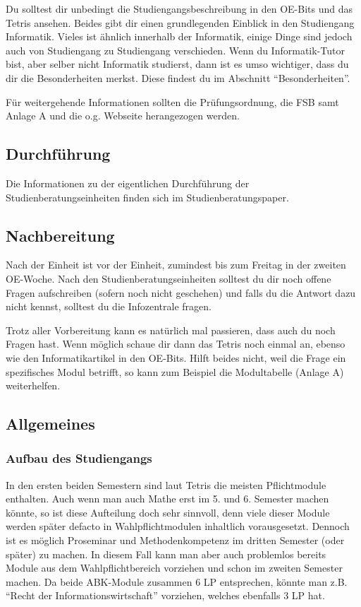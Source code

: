 \documentclass[a4paper,11pt]{scrartcl} %
\begin{document}
Du solltest dir unbedingt die Studiengangsbeschreibung in den OE-Bits und das Tetris ansehen. Beides gibt dir einen grundlegenden Einblick in den Studiengang Informatik. Vieles ist ähnlich innerhalb der Informatik, einige Dinge sind jedoch auch von Studiengang zu Studiengang verschieden. Wenn du Informatik-Tutor bist, aber selber nicht Informatik studierst, dann ist es umso wichtiger, dass du dir die Besonderheiten merkst. Diese findest du im Abschnitt "`Besonderheiten"'.

Für weitergehende Informationen sollten die Prüfungsordnung, die FSB samt Anlage A und die o.g. Webseite herangezogen werden.

	\subsection{Durchführung}
	
Die Informationen zu der eigentlichen Durchführung der Studienberatungseinheiten finden sich im Studienberatungspaper. 

	\subsection{Nachbereitung}

Nach der Einheit ist vor der Einheit, zumindest bis zum Freitag in der zweiten OE-Woche. Nach den Studienberatungseinheiten solltest du dir noch offene Fragen aufschreiben (sofern noch nicht geschehen) und falls du die Antwort dazu nicht kennst, solltest du die Infozentrale fragen.

Trotz aller Vorbereitung kann es natürlich mal passieren, dass auch du noch Fragen hast. Wenn möglich schaue dir dann das Tetris noch einmal an, ebenso wie den Informatikartikel in den OE-Bits. Hilft beides nicht, weil die Frage ein spezifisches Modul betrifft, so kann zum Beispiel die Modultabelle (Anlage A) weiterhelfen.

	\subsection{Allgemeines}
	
		\subsubsection*{Aufbau des Studiengangs}

		In den ersten beiden Semestern sind laut Tetris die meisten Pflichtmodule enthalten. Auch wenn man auch Mathe erst im 5. und 6. Semester machen könnte, so ist diese Aufteilung doch sehr sinnvoll, denn viele dieser Module werden später defacto in Wahlpflichtmodulen inhaltlich vorausgesetzt. Dennoch ist es möglich Proseminar und Methodenkompetenz im dritten Semester (oder später) zu machen. In diesem Fall kann man aber auch problemlos bereits Module aus dem Wahlpflichtbereich vorziehen und schon im zweiten Semester machen. Da beide ABK-Module zusammen 6 LP entsprechen, könnte man z.B. "`Recht der Informationswirtschaft"' vorziehen, welches ebenfalls 3 LP hat.
		
\end{document}
